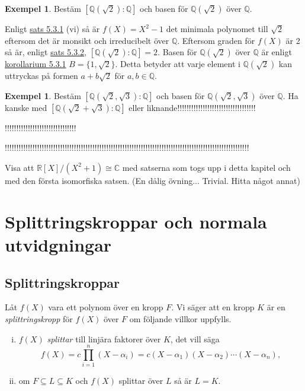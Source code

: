 \documentclass{article}
\theoremstyle{definition}
\newtheorem{exmp}[thm]{Exempel}
\begin{document}
\begin{exmp}
  Bestäm $[\mathbb{Q}(\sqrt{2}): \mathbb{\mathbb{Q}}]$ och basen för $\mathbb{Q}(\sqrt{2})$ över $\mathbb{Q}$.

  Enligt \hyperlink{minpol}{sats 5.3.1} (vi) så är $f(X) = X^2-1$ det minimala polynomet till $\sqrt{2}$ eftersom det är monsikt och irreducibelt över $\mathbb{Q}$. 
  Eftersom graden för $f(X)$ är 2 så är, enligt \hyperlink{5.3.2}{sats 5.3.2}, $[\mathbb{Q}(\sqrt{2}): \mathbb{\mathbb{Q}}] = 2.$ Basen för $\mathbb{Q}(\sqrt{2})$ över $\mathbb{Q}$
  är enligt \hyperlink{kol5.3.1}{korollarium 5.3.1} $B = \{1, \sqrt{2}\}$. Detta betyder att varje element i $\mathbb{Q}(\sqrt{2})$ kan uttryckas 
  på formen $a + b\sqrt{2}$ för $a, b \in \mathbb{Q}.$

\end{exmp}

\begin{exmp}
  Bestäm $[\mathbb{Q}(\sqrt{2}, \sqrt{3}): \mathbb{\mathbb{Q}}]$ och basen för $\mathbb{Q}(\sqrt{2}, \sqrt{3})$ över $\mathbb{Q}$.
  Ha kanske med $[\mathbb{Q}(\sqrt{2} + \sqrt{3}): \mathbb{\mathbb{Q}}]$ eller liknande!!!!!!!!!!!!!!!!!!!!!!!!!!!!!!!!!!
  
  !!!!!!!!!!!!!!!!!!!!!!!!!!!!!!!

  !!!!!!!!!!!!!!!!!!!!!!!!!!!!!!!!!!!!!!!!!!!!!!!!!!!!!!!!!!!!!!!!!!!!!!!!!!!!!!!!!!!!!!!!!!!!!!!!!!!!!!!!!!
\end{exmp}

\begin{ovning}{5}
  Visa att $\mathbb{R}[X]/(X^2+1) \cong \mathbb{C}$ med satserna som togs upp i detta kapitel och med den första isomorfiska satsen. 
  (En dålig övning... Trivial. Hitta något annat) 
\end{ovning}

\section{Splittringskroppar och normala utvidgningar}
\subsection{Splittringskroppar}
\begin{mydef}{}{}
  Låt $f(X)$ vara ett polynom över en kropp $F$. Vi säger att en kropp $K$ är en \textit{splittringskropp} för $f(X)$ över $F$ om följande villkor uppfylls. 
  \begin{enumerate}[(i)]
    \item $f(X)$ \textit{splittar} till linjära faktorer över $K$, det vill säga 
    \[f(X) = c \prod_{i=1}^n (X- \alpha_i) = c(X-\alpha_1)(X-\alpha_2)\cdots (X-\alpha_n),\]
    \item om $F \subseteq L \subseteq K$ och $f(X)$ splittar över $L$ så är $L = K.$
  \end{enumerate}
\end{mydef}
\end{document}
